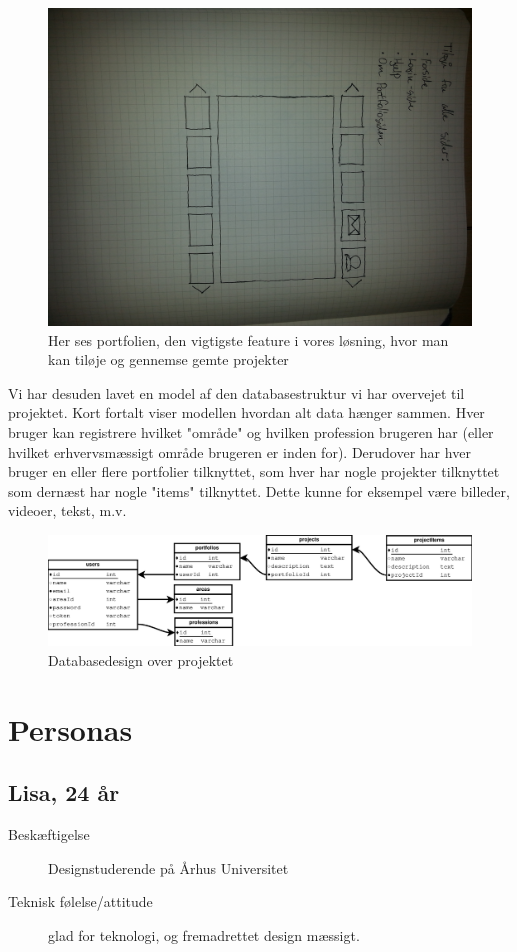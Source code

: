 \documentclass[a4paper,titlepage,fleqn,12pt]{article}
\begin{document}
\begin{figure}[H]
\includegraphics[width=\textwidth]{mainside.jpg}
\caption{Her ses portfolien, den vigtigste feature i vores løsning, hvor man kan tiløje og gennemse gemte projekter}
\end{figure}

Vi har desuden lavet en model af den databasestruktur vi har overvejet til projektet. Kort fortalt viser modellen hvordan alt data hænger sammen. Hver bruger kan registrere hvilket "område" og hvilken profession brugeren har (eller hvilket erhvervsmæssigt område brugeren er inden for). Derudover har hver bruger en eller flere portfolier tilknyttet, som hver har nogle projekter tilknyttet som dernæst har nogle "items" tilknyttet. Dette kunne for eksempel være billeder, videoer, tekst, m.v.

\begin{figure}[H]
	\includegraphics[width=\textwidth]{database.eps}
	\caption{Databasedesign over projektet}
\end{figure}

\section{Personas}
\subsection{Lisa, 24 år}
\begin{description}
	\item[Beskæftigelse] Designstuderende på Århus Universitet
	\item[Teknisk følelse/attitude] glad for teknologi, og fremadrettet design mæssigt.
\end{description}
\end{document}
